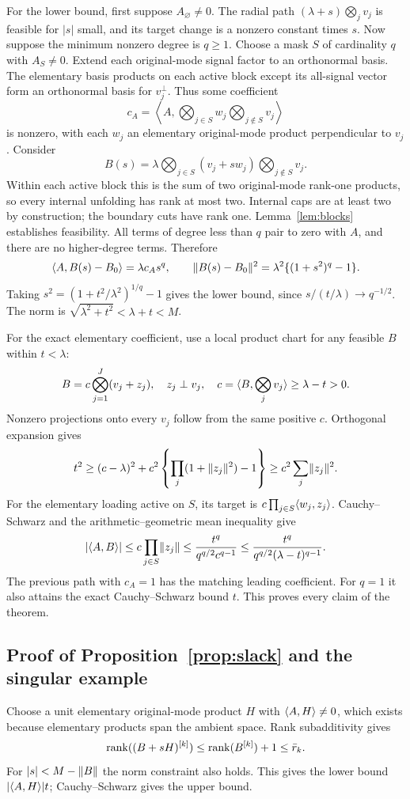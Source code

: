 For the lower bound, first suppose $A_\varnothing\ne0$. The radial path $(\lambda+s)\bigotimes_jv_j$ is feasible for $|s|$ small, and its target change is a nonzero constant times $s$. Now suppose the minimum nonzero degree is $q\ge1$. Choose a mask $S$ of cardinality $q$ with $A_S\ne0$. Extend each original-mode signal factor to an orthonormal basis. The elementary basis products on each active block except its all-signal vector form an orthonormal basis for $v_j^\perp$. Thus some coefficient
\[
 c_A=\left\langle A,\bigotimes_{j\in S}w_j\bigotimes_{j\notin S}v_j\right\rangle
\]
is nonzero, with each $w_j$ an elementary original-mode product perpendicular to $v_j$. Consider
\[
 B(s)=\lambda\bigotimes_{j\in S}(v_j+s w_j)
                \bigotimes_{j\notin S}v_j.
\]
Within each active block this is the sum of two original-mode rank-one products, so every internal unfolding has rank at most two. Internal caps are at least two by construction; the boundary cuts have rank one. Lemma~\ref{lem:blocks} establishes feasibility. All terms of degree less than $q$ pair to zero with $A$, and there are no higher-degree terms. Therefore
\[
 \langle A,B(s)-B_0\rangle=\lambda c_A s^q,\qquad
 \lVert B(s)-B_0\rVert^2=\lambda^2\{(1+s^2)^q-1\}.
\]
Taking $s^2=(1+t^2/\lambda^2)^{1/q}-1$ gives the lower bound, since $s/(t/\lambda)\to q^{-1/2}$. The norm is $\sqrt{\lambda^2+t^2}<\lambda+t<M$.

For the exact elementary coefficient, use a local product chart for any feasible $B$ within $t<\lambda$:
\[
 B=c\bigotimes_{j=1}^J(v_j+z_j),\quad z_j\perp v_j,
 \quad c=\langle B,\bigotimes_jv_j\rangle\ge\lambda-t>0.
\]
Nonzero projections onto every $v_j$ follow from the same positive $c$. Orthogonal expansion gives
\[
 t^2\ge(c-\lambda)^2+c^2\left\{\prod_j(1+\lVert z_j\rVert^2)-1\right\}
 \ge c^2\sum_j\lVert z_j\rVert^2.
\]
For the elementary loading active on $S$, its target is $c\prod_{j\in S}\langle w_j,z_j\rangle$. Cauchy--Schwarz and the arithmetic--geometric mean inequality give
\[
 |\langle A,B\rangle|\le c\prod_{j\in S}\lVert z_j\rVert
 \le\frac{t^q}{q^{q/2}c^{q-1}}
 \le\frac{t^q}{q^{q/2}(\lambda-t)^{q-1}}.
\]
The previous path with $c_A=1$ has the matching leading coefficient. For $q=1$ it also attains the exact Cauchy--Schwarz bound $t$. This proves every claim of the theorem.

\subsection{Proof of Proposition~\ref{prop:slack} and the singular example}
Choose a unit elementary original-mode product $H$ with $\langle A,H\rangle\ne0$, which exists because elementary products span the ambient space. Rank subadditivity gives
\[
 \operatorname{rank}((B+sH)^{[k]})\le\operatorname{rank}(B^{[k]})+1\le\bar r_k.
\]
For $|s|<M-\lVert B\rVert$ the norm constraint also holds. This gives the lower bound $|\langle A,H\rangle|t$; Cauchy--Schwarz gives the upper bound.

